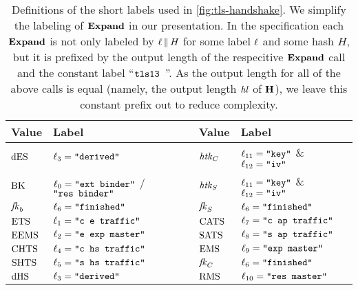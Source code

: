 \begin{table}[htp]
	\centering
	\setlength{\tabcolsep}{4pt}
	\renewcommand{\arraystretch}{1.1}
	\begin{tabular}{@{}ll@{\qquad}ll@{}}
		\toprule
		\textbf{Value} & \textbf{Label}                                                  & \textbf{Value}                   & \textbf{Label}                        \\ \midrule
		$\mathrm{dES}$         & $\ell_{3} = \texttt{"derived"}$                             & $\mathit{htk}_C$ &    $\ell_{11} = \texttt{"key"}$ \& $\ell_{12}= \texttt{"iv"}$                         \\
		$\mathrm{BK}$          & $\ell_{0} = \texttt{"ext binder"}$ / $\texttt{"res binder"}$ & $\mathit{htk}_S$                          & $\ell_{11} = \texttt{"key"}$ \& $\ell_{12}= \texttt{"iv"}$                                    \\
		$\mathit{fk}_b$         & $\ell_{6} = \texttt{"finished"}$                           & $\mathit{fk}_S$                           & $\ell_{6} = \texttt{"finished"}$ \\
		$\mathrm{ETS}$         & $\ell_{1} = \texttt{"c e traffic"}$                                     & $\mathrm{CATS}$                          & $\ell_{7} = \texttt{"c ap traffic"}$         \\
		$\mathrm{EEMS}$        & $\ell_{2} = \texttt{"e exp master"}$                                   & $\mathrm{SATS}$                          & $\ell_{8} = \texttt{"s ap traffic"}$         \\
		$\mathrm{CHTS}$        & $\ell_{4} = \texttt{"c hs traffic"}$                                   & $\mathrm{EMS}$                           & $\ell_{9} = \texttt{"exp master"}$           \\
		$\mathrm{SHTS}$        & $\ell_{5} = \texttt{"s hs traffic"}$                                   & $\mathit{fk}_C$                           & $\ell_{6} = \texttt{"finished"}$ \\
		$\mathrm{dHS}$         & $\ell_{3} = \texttt{"derived"}$                             & $\mathrm{RMS}$                           & $\ell_{10} = \texttt{"res master"}$           \\ \bottomrule
	\end{tabular}
	\medskip
	\caption{%
		Definitions of the short labels used in \autoref{fig:tls-handshake}.
		We simplify the labeling of $\mathbf{Expand}$ in our presentation.
		In the specification each $\mathbf{Expand}$ is not only labeled by $\ell {\,\|\,} H$ for some label $\ell$ and some hash $H$,
		but it is prefixed by the output length of the respecitive $\mathbf{Expand}$ call and the constant label ``$\texttt{tls13 }$''.
		As the output length for all of the above calls is equal (namely, the output length $\mathit{hl}$ of $\mathbf{H}$), we leave this constant prefix out to reduce complexity.
		}
	\label{tab:labels}
\end{table}